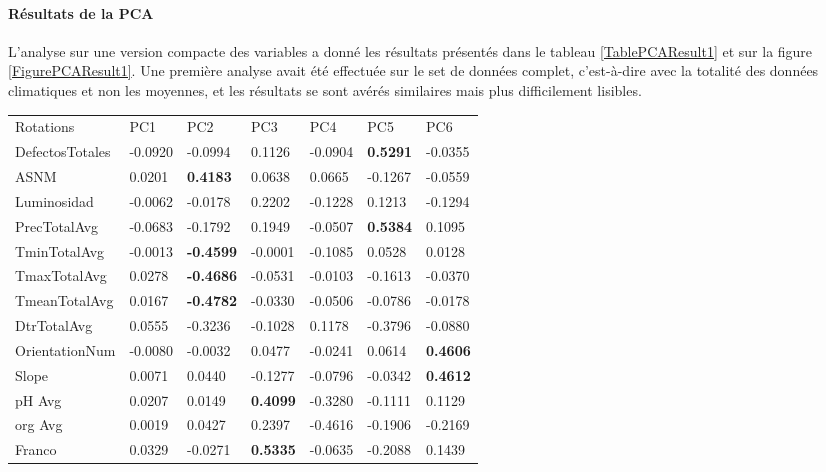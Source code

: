 \paragraph{Résultats de la PCA}

L'analyse sur une version compacte des variables a donné les résultats présentés dans le tableau \ref{TablePCAResult1} et sur la figure \ref{FigurePCAResult1}. Une première analyse avait été effectuée sur le set de données complet, c'est-à-dire avec la totalité des données climatiques et non les moyennes, et les résultats se sont avérés similaires mais plus difficilement lisibles.  

\begin{table}[H]
	\centering
	
	\begin{tabular}{lllllll}
		Rotations       & PC1     & PC2     & PC3     & PC4     & PC5     & PC6     \\
		DefectosTotales & -0.0920 & -0.0994 & 0.1126  & -0.0904 & \textbf{0.5291}  & -0.0355 \\
		ASNM            & 0.0201  & \textbf{0.4183}  & 0.0638  & 0.0665  & -0.1267 & -0.0559 \\
		Luminosidad     & -0.0062 & -0.0178 & 0.2202  & -0.1228 & 0.1213  & -0.1294 \\
		PrecTotalAvg    & -0.0683 & -0.1792 & 0.1949  & -0.0507 & \textbf{0.5384}  & 0.1095  \\
		TminTotalAvg    & -0.0013 & \textbf{-0.4599} & -0.0001 & -0.1085 & 0.0528  & 0.0128  \\
		TmaxTotalAvg    & 0.0278  & \textbf{-0.4686} & -0.0531 & -0.0103 & -0.1613 & -0.0370 \\
		TmeanTotalAvg   & 0.0167  & \textbf{-0.4782} & -0.0330 & -0.0506 & -0.0786 & -0.0178 \\
		DtrTotalAvg     & 0.0555  & -0.3236 & -0.1028 & 0.1178  & -0.3796 & -0.0880 \\
		OrientationNum  & -0.0080 & -0.0032 & 0.0477  & -0.0241 & 0.0614  & \textbf{0.4606}  \\
		Slope           & 0.0071  & 0.0440  & -0.1277 & -0.0796 & -0.0342 & \textbf{0.4612}  \\
		pH Avg         & 0.0207  & 0.0149  & \textbf{0.4099}  & -0.3280 & -0.1111 & 0.1129  \\
		org Avg        & 0.0019  & 0.0427  & 0.2397  & -0.4616 & -0.1906 & -0.2169 \\
		Franco          & 0.0329  & -0.0271 & \textbf{0.5335}  & -0.0635 & -0.2088 & 0.1439  \\

\end{tabular}
\end{table}
